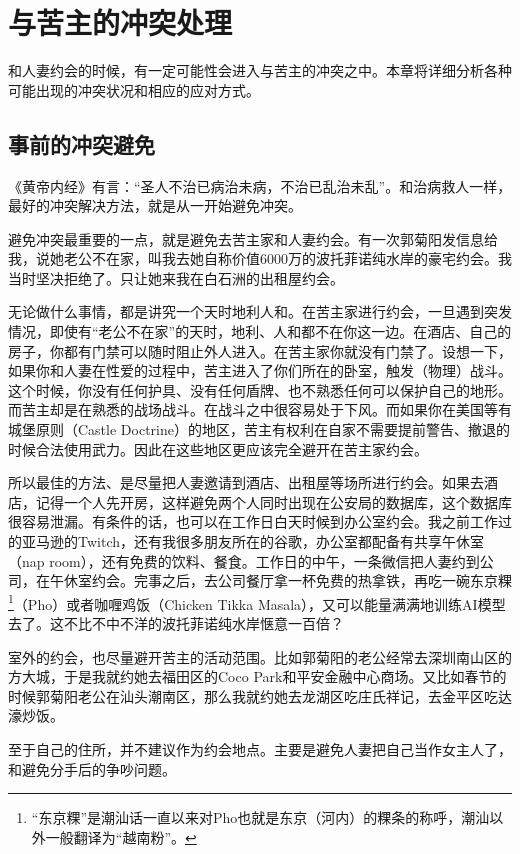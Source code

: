 \chapter{与苦主的冲突处理}

和人妻约会的时候，有一定可能性会进入与苦主的冲突之中。本章将详细分析各种可能出现的冲突状况和相应的应对方式。

\section{事前的冲突避免}

《黄帝内经》有言：“圣人不治已病治未病，不治已乱治未乱”。和治病救人一样，最好的冲突解决方法，就是从一开始避免冲突。

避免冲突最重要的一点，就是避免去苦主家和人妻约会。有一次郭菊阳发信息给我，说她老公不在家，叫我去她自称价值6000万的波托菲诺纯水岸的豪宅约会。我当时坚决拒绝了。只让她来我在白石洲的出租屋约会。

无论做什么事情，都是讲究一个天时地利人和。在苦主家进行约会，一旦遇到突发情况，即使有“老公不在家”的天时，地利、人和都不在你这一边。在酒店、自己的房子，你都有门禁可以随时阻止外人进入。在苦主家你就没有门禁了。设想一下，如果你和人妻在性爱的过程中，苦主进入了你们所在的卧室，触发（物理）战斗。这个时候，你没有任何护具、没有任何盾牌、也不熟悉任何可以保护自己的地形。而苦主却是在熟悉的战场战斗。在战斗之中很容易处于下风。而如果你在美国等有城堡原则（Castle Doctrine）的地区，苦主有权利在自家不需要提前警告、撤退的时候合法使用武力。因此在这些地区更应该完全避开在苦主家约会。

所以最佳的方法、是尽量把人妻邀请到酒店、出租屋等场所进行约会。如果去酒店，记得一个人先开房，这样避免两个人同时出现在公安局的数据库，这个数据库很容易泄漏。有条件的话，也可以在工作日白天时候到办公室约会。我之前工作过的亚马逊的Twitch，还有我很多朋友所在的谷歌，办公室都配备有共享午休室（nap room），还有免费的饮料、餐食。工作日的中午，一条微信把人妻约到公司，在午休室约会。完事之后，去公司餐厅拿一杯免费的热拿铁，再吃一碗东京粿\footnote{``东京粿''是潮汕话一直以来对Pho也就是东京（河内）的粿条的称呼，潮汕以外一般翻译为``越南粉''。}（Pho）或者咖喱鸡饭（Chicken Tikka Masala），又可以能量满满地训练AI模型去了。这不比不中不洋的波托菲诺纯水岸惬意一百倍？

室外的约会，也尽量避开苦主的活动范围。比如郭菊阳的老公经常去深圳南山区的方大城，于是我就约她去福田区的Coco Park和平安金融中心商场。又比如春节的时候郭菊阳老公在汕头潮南区，那么我就约她去龙湖区吃庄氏祥记，去金平区吃达濠炒饭。

至于自己的住所，并不建议作为约会地点。主要是避免人妻把自己当作女主人了，和避免分手后的争吵问题。

